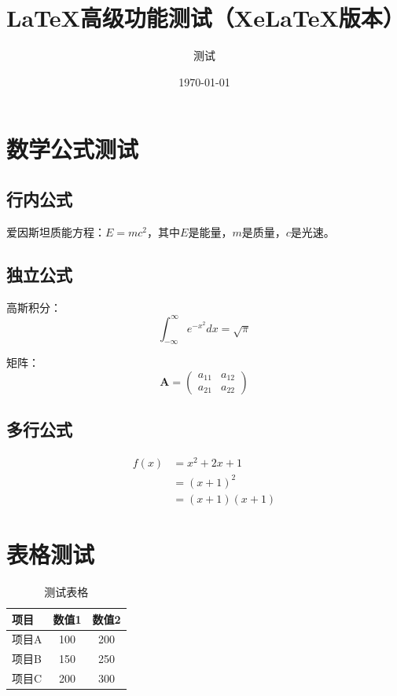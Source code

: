 \documentclass[12pt,a4paper]{article}
\title{LaTeX高级功能测试（XeLaTeX版本）}
\author{测试}
\date{\today}
\begin{document}
\maketitle

\tableofcontents  %
\newpage

\section{数学公式测试}

\subsection{行内公式}

爱因斯坦质能方程：$E = mc^2$，其中$E$是能量，$m$是质量，$c$是光速。

\subsection{独立公式}

高斯积分：
\begin{equation}
\int_{-\infty}^{\infty} e^{-x^2} dx = \sqrt{\pi}
\label{eq:gaussian}
\end{equation}

矩阵：
\begin{equation}
\mathbf{A} = \begin{pmatrix}
a_{11} & a_{12} \\
a_{21} & a_{22}
\end{pmatrix}
\label{eq:matrix}
\end{equation}

\subsection{多行公式}

\begin{align}
f(x) &= x^2 + 2x + 1 \\
     &= (x+1)^2 \\
     &= (x+1)(x+1)
\label{eq:align}
\end{align}

\section{表格测试}

\begin{table}[H]
\centering
\caption{测试表格}
\label{tab:test}
\begin{tabular}{lcc}
\toprule
项目 & 数值1 & 数值2 \\
\midrule
项目A & 100 & 200 \\
项目B & 150 & 250 \\
项目C & 200 & 300 \\
\bottomrule
\end{tabular}
\end{table}
\end{document}
